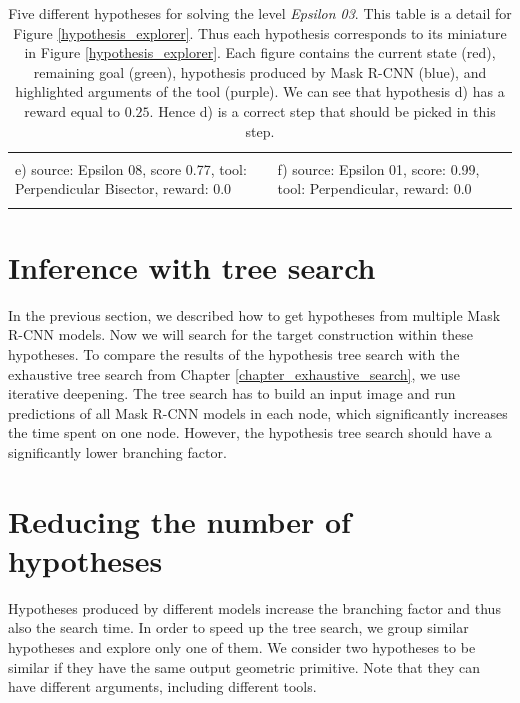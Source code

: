 \begin{longtable}{m{}m{}}
\begin{subfigure}
         \end{subfigure}
         \\
         e) source: Epsilon 08, score 0.77, tool: Perpendicular Bisector, reward: 0.0 &
         f) source: Epsilon 01, score: 0.99, tool: Perpendicular, reward: 0.0 
         \\
\caption{Five different hypotheses for solving the level \textit{Epsilon 03}. This table is a detail for Figure \ref{hypothesis_explorer}. Thus each hypothesis corresponds to its miniature in Figure \ref{hypothesis_explorer}. Each figure contains the current state (red), remaining goal (green), hypothesis produced by Mask R-CNN (blue), and highlighted arguments of the tool (purple). We can see that hypothesis d) has a reward equal to $0.25$. Hence d) is a correct step that should be picked in this step.}
\label{hypothesis_explorer_detail}
\end{longtable}

\section{Inference with tree search}
\label{hypotheses_tree_search}
In the previous section, we described how to get hypotheses from multiple Mask {R-CNN} models. Now we will search for the target construction within these hypotheses. To compare the results of the hypothesis tree search with the exhaustive tree search from Chapter \ref{chapter_exhaustive_search}, we use iterative deepening. The tree search has to build an input image and run predictions of all Mask {R-CNN} models in each node, which significantly increases the time spent on one node. However, the hypothesis tree search should have a significantly lower branching factor.

\section{Reducing the number of hypotheses}
\label{reducing_hypotheses}
Hypotheses produced by different models increase the branching factor and thus also the search time. In order to speed up the tree search, we group similar hypotheses and explore only one of them. We consider two hypotheses to be similar if they have the same output geometric primitive. Note that they can have different arguments, including different tools.

